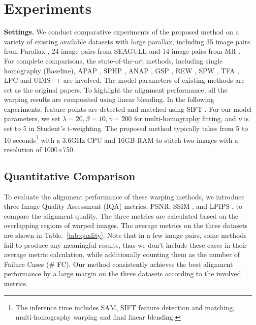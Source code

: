 \documentclass[10pt,twocolumn,letterpaper]{article}
\begin{document}
\section{Experiments}
\label{sec:exp}





\noindent\textbf{Settings.} We conduct comparative experiments of the proposed method on a variety of existing available datasets with large parallax, including 35 image pairs from Parallax \cite{zhang2014parallax}, 24 image pairs from SEAGULL \cite{lin2016seagull} and 14 image pairs from MR \cite{herrmann2018robust}. For complete comparisons, the state-of-the-art methods, including single homography (Baseline), APAP \cite{zaragoza2014projective}, SPHP \cite{chang2014shape}, ANAP \cite{lin2015adaptive}, GSP \cite{chen2016natural}, REW \cite{li2018parallax}, SPW \cite{liao2020Single}, TFA \cite{li2019local}, LPC \cite{jia2021Leveraging} and UDIS++ \cite{nie2023parallax} are involved. The model parameters of existing methods are set as the original papers. To highlight the alignment performance, all the warping results are composited using linear blending. In the following experiments, feature points are detected and matched using SIFT \cite{lowe2004distinctive}. For our model parameters, we set $\lambda=20, \beta=10, \gamma=200$ for multi-homography fitting, and $\nu$ is set to 5 in Student's t-weighting. The proposed method typically takes from 5 to 10 seconds\footnote{The inference time includes SAM, SIFT feature detection and matching, multi-homography warping and final linear blending.} with a 3.6GHz CPU and 16GB RAM to stitch two images with a resolution of 1000$\times$750.




\subsection{Quantitative Comparison}

To evaluate the alignment performance of these warping methods, we introduce three 
Image Quality Assessment (IQA) metrics, PSNR, SSIM \cite{wang2004image}, and LPIPS \cite{zhang2018unreasonable}, to compare the alignment quality. The three metrics are calculated based on the overlapping regions of warped images. The average metrics on the three datasets are shown in Table.~\ref{tab:quality}. Note that in a few image pairs, some methods fail to produce any meaningful results, thus we don't include these cases in their average metric calculation, while additionally counting them as the number of Failure Cases (\# FC). Our method consistently achieves the best alignment performance by a large margin on the three datasets according to the involved metrics.
\end{document}
